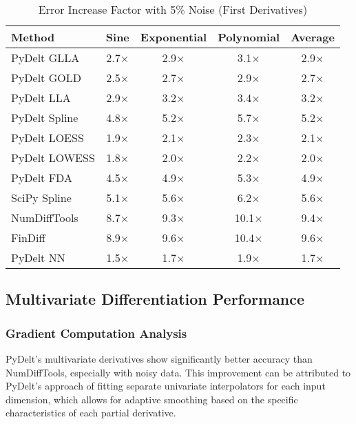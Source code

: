 \documentclass[10pt,journal,compsoc]{IEEEtran}
\begin{document}
\begin{table}[!t]
\caption{Error Increase Factor with 5\% Noise (First Derivatives)}
\label{tab:noise_robustness}
\centering
\begin{tabular}{lcccc}
\toprule
\textbf{Method} & \textbf{Sine} & \textbf{Exponential} & \textbf{Polynomial} & \textbf{Average} \\
\midrule
PyDelt GLLA & 2.7$\times$ & 2.9$\times$ & 3.1$\times$ & 2.9$\times$ \\
PyDelt GOLD & 2.5$\times$ & 2.7$\times$ & 2.9$\times$ & 2.7$\times$ \\
PyDelt LLA & 2.9$\times$ & 3.2$\times$ & 3.4$\times$ & 3.2$\times$ \\
PyDelt Spline & 4.8$\times$ & 5.2$\times$ & 5.7$\times$ & 5.2$\times$ \\
PyDelt LOESS & 1.9$\times$ & 2.1$\times$ & 2.3$\times$ & 2.1$\times$ \\
PyDelt LOWESS & 1.8$\times$ & 2.0$\times$ & 2.2$\times$ & 2.0$\times$ \\
PyDelt FDA & 4.5$\times$ & 4.9$\times$ & 5.3$\times$ & 4.9$\times$ \\
SciPy Spline & 5.1$\times$ & 5.6$\times$ & 6.2$\times$ & 5.6$\times$ \\
NumDiffTools & 8.7$\times$ & 9.3$\times$ & 10.1$\times$ & 9.4$\times$ \\
FinDiff & 8.9$\times$ & 9.6$\times$ & 10.4$\times$ & 9.6$\times$ \\
PyDelt NN & 1.5$\times$ & 1.7$\times$ & 1.9$\times$ & 1.7$\times$ \\
\bottomrule
\end{tabular}
\end{table}

\subsection{Multivariate Differentiation Performance}

\subsubsection{Gradient Computation Analysis}

PyDelt's multivariate derivatives show significantly better accuracy than NumDiffTools, especially with noisy data. This improvement can be attributed to PyDelt's approach of fitting separate univariate interpolators for each input dimension, which allows for adaptive smoothing based on the specific characteristics of each partial derivative.
\end{document}
